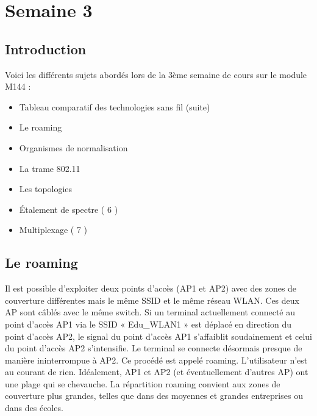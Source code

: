 \documentclass[letterpaper,10pt,french]{sphinxmanual}
\begin{document}
\section{Semaine 3}
\label{\detokenize{Documentation-M144:semaine-3}}

\subsection{Introduction}
\label{\detokenize{Documentation-M144:id2}}
\sphinxAtStartPar
Voici les différents sujets abordés lors de la 3ème semaine de cours sur le module M144 :
\begin{itemize}
\item {} 
\sphinxAtStartPar
Tableau comparatif des technologies sans fil (suite)

\item {} 
\sphinxAtStartPar
Le roaming

\item {} 
\sphinxAtStartPar
Organismes de normalisation

\item {} 
\sphinxAtStartPar
La trame 802.11

\item {} 
\sphinxAtStartPar
Les topologies

\item {} 
\sphinxAtStartPar
Étalement de spectre ( 6 )

\item {} 
\sphinxAtStartPar
Multiplexage ( 7 )

\end{itemize}


\subsection{Le roaming}
\label{\detokenize{Documentation-M144:le-roaming}}
\sphinxAtStartPar
Il est possible d’exploiter deux points d’accès (AP1 et AP2) avec des zones de couverture différentes mais le même SSID et le même réseau W\sphinxhyphen{}LAN. Ces deux AP sont câblés avec le même switch. Si un terminal actuellement connecté au point d’accès AP1 via le SSID « Edu\_WLAN1 » est déplacé en direction du point d’accès AP2, le signal du point d’accès AP1 s’affaiblit soudainement et celui du point d’accès AP2 s’intensifie. Le terminal se connecte désormais presque de manière ininterrompue à AP2. Ce procédé est appelé roaming. L’utilisateur n’est au courant de rien. Idéalement, AP1 et AP2 (et éventuellement d’autres AP) ont une plage qui se chevauche. La répartition roaming convient aux zones de couverture plus grandes, telles que dans des moyennes et grandes entreprises ou dans des écoles.
\end{document}
